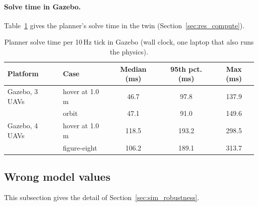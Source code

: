\paragraph{Solve time in Gazebo.} Table~\ref{tab:solve_times} gives the planner's solve time in the twin
(Section~\ref{sec:res_compute}).
\begin{table}[h]
\centering
\caption{Planner solve time per 10\,Hz tick in Gazebo (wall clock, one laptop that also runs the physics).}
\label{tab:solve_times}
\begin{tabular}{llccc}
\toprule
Platform & Case & Median (ms) & 95th pct. (ms) & Max (ms) \\
\midrule
Gazebo, 3 UAVs & hover at 1.0\,m & 46.7 & 97.8 & 137.9 \\
               & orbit & 47.1 & 91.0 & 149.6 \\
Gazebo, 4 UAVs & hover at 1.0\,m & 118.5 & 193.2 & 298.5 \\
               & figure-eight & 106.2 & 189.1 & 313.7 \\
\bottomrule
\end{tabular}
\end{table}

\subsection{Wrong model values}
\label{sec:app_robust}

This subsection gives the detail of Section~\ref{sec:sim_robustness}.

